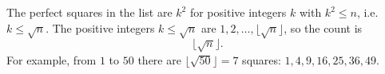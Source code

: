 The perfect squares in the list are $k^2$ for positive integers $k$ with $k^2\le n$, i.e.\ $k\le\sqrt n$. The positive integers $k\le\sqrt n$ are $1,2,\dots,\lfloor\sqrt n\rfloor$, so the count is
\[
\boxed{\lfloor\sqrt n\rfloor}.
\]
For example, from $1$ to $50$ there are $\lfloor\sqrt{50}\rfloor=7$ squares: $1,4,9,16,25,36,49$.
